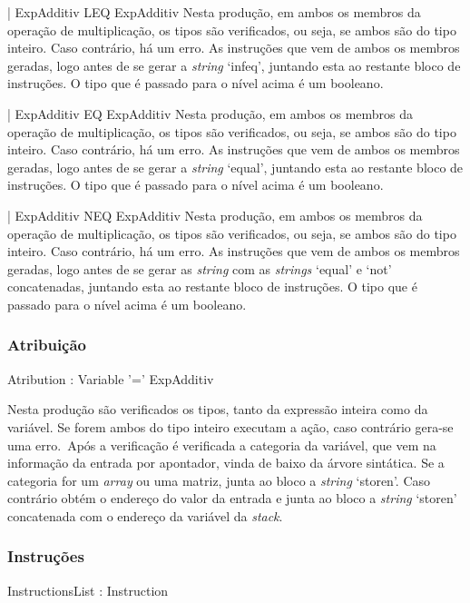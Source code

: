 |  ExpAdditiv LEQ ExpAdditiv
Nesta  produção, em ambos os membros da operação de multiplicação, os tipos são
verificados, ou seja, se ambos são do tipo inteiro. Caso contrário, há um erro.
As instruções que vem de ambos os membros geradas, logo antes de se gerar
a \emph{string} `infeq', juntando esta ao restante bloco de instruções. O tipo que
é passado para o nível acima é um  booleano.


|  ExpAdditiv EQ  ExpAdditiv
Nesta  produção, em ambos os membros da operação de multiplicação, os tipos são
verificados, ou seja, se ambos são do tipo inteiro. Caso contrário, há um erro.
As instruções que vem de ambos os membros geradas, logo antes de se gerar
a \emph{string} `equal', juntando esta ao restante bloco de instruções. O tipo que
é passado para o nível acima é um  booleano.

|  ExpAdditiv NEQ ExpAdditiv
Nesta  produção, em ambos os membros da operação de multiplicação, os tipos são
verificados, ou seja, se ambos são do tipo inteiro. Caso contrário, há um erro.
As instruções que vem de ambos os membros geradas, logo antes de se gerar as
\emph{string} com as \emph{strings} `equal' e `not' concatenadas, juntando esta
ao restante bloco de instruções. O tipo que é passado para o nível acima é um
booleano.

\subsubsection{Atribuição}
                                    
Atribution :  Variable '=' ExpAdditiv  

Nesta produção são verificados os tipos, tanto da expressão inteira como da
variável. Se forem ambos do tipo inteiro executam a ação, caso contrário gera-se
uma erro.\ Após a verificação é verificada a categoria da variável, que vem na
informação da entrada por apontador, vinda de baixo da árvore sintática. Se
a categoria for um \emph{array} ou uma matriz, junta ao bloco a \emph{string}
`storen'. Caso contrário  obtém o endereço do valor da entrada e junta ao bloco
a \emph{string} `storen' concatenada com o endereço da variável da \emph{stack}.  



\subsubsection{Instruções}

InstructionsList : Instruction           

